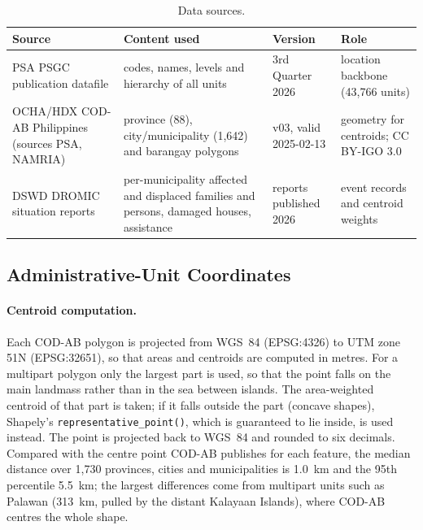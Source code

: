 \documentclass[acmtog]{acmart}
\begin{document}
\begin{table}[t]
  \caption{Data sources.}
  \label{tab:sources}
  \small
  \begin{tabular}{p{4.2cm}p{4.4cm}p{3.0cm}p{3.6cm}}
    \toprule
    Source & Content used & Version & Role \\
    \midrule
    PSA PSGC publication datafile & codes, names, levels and hierarchy of all units & 3rd Quarter 2026 & location backbone (43,766 units) \\
    OCHA/HDX COD-AB Philippines (sources PSA, NAMRIA) & province (88), city/municipality (1,642) and barangay polygons & v03, valid 2025-02-13 & geometry for centroids; CC BY-IGO 3.0 \\
    DSWD DROMIC situation reports & per-municipality affected and displaced families and persons, damaged houses, assistance & reports published 2026 & event records and centroid weights \\
    \bottomrule
  \end{tabular}
\end{table}

\subsection{Administrative-Unit Coordinates}

\paragraph{Centroid computation.} Each COD-AB polygon is projected from WGS~84 (EPSG:4326) to
UTM zone 51N (EPSG:32651), so that areas and centroids are computed in metres. For a multipart
polygon only the largest part is used, so that the point falls on the main landmass rather than
in the sea between islands. The area-weighted centroid of that part is taken; if it falls
outside the part (concave shapes), Shapely's \texttt{representative\_point()}, which is
guaranteed to lie inside, is used instead. The point is projected back to WGS~84 and rounded to
six decimals. Compared with the centre point COD-AB publishes for each feature, the median
distance over 1,730 provinces, cities and municipalities is 1.0~km and the 95th percentile
5.5~km; the largest differences come from multipart units such as Palawan (313~km, pulled by the
distant Kalayaan Islands), where COD-AB centres the whole shape.
\end{document}
